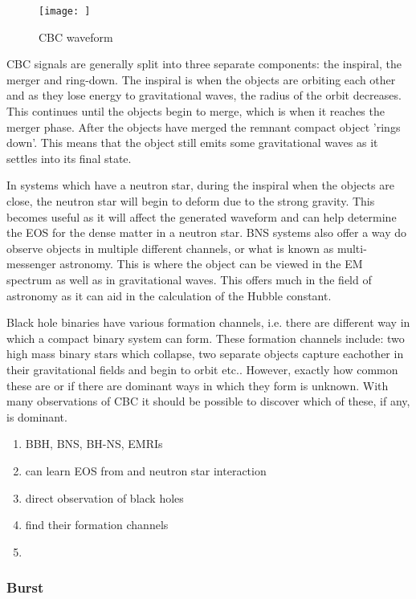 \begin{figure}
    \centering
    \texttt{[image: ]}
    \caption{CBC waveform}
    \label{sources:transient:cbc:wave}
\end{figure}


\ac{CBC} signals are generally split into three separate components: the inspiral, the merger and ring-down. 
The inspiral is when the objects are orbiting each other and as they lose energy to gravitational waves, the radius of the orbit decreases.
This continues until the objects begin to merge, which is when it reaches the merger phase.
After the objects have merged the remnant compact object 'rings down'. This means that the object still emits some gravitational waves as it settles into its final state.

In systems which have a neutron star, during the inspiral when the objects are close, the neutron star will begin to deform due to the strong gravity. 
This becomes useful as it will affect the generated waveform and can help determine the \ac{EOS} for the dense matter in a neutron star.
\ac{BNS} systems also offer a way do observe objects in multiple different channels, or what is known as multi-messenger astronomy. 
This is where the object can be viewed in the \ac{EM} spectrum as well as in gravitational waves.
This offers much in the field of astronomy as it can aid in the calculation of the Hubble constant. 


Black hole binaries have various formation channels, i.e. there are different way in which a compact binary system can form. 
These formation channels include: two high mass binary stars which collapse, two separate objects capture eachother in their gravitational fields and begin to orbit etc..
However, exactly how common these are or if there are dominant ways in which they form is unknown. 
With many observations of \ac{CBC} it should be possible to discover which of these, if any, is dominant.

\begin{enumerate}
    \item BBH, BNS, BH-NS, EMRIs 
    \item can learn EOS from and neutron star interaction
    \item direct observation of black holes
    \item find their formation channels
    \item 
\end{enumerate}


\subsubsection{\label{sources:transient:burst}Burst}

